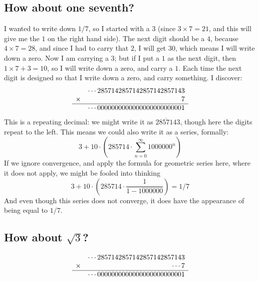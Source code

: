 \documentclass[12pt]{article}
\begin{document}
\subsection*{How about one seventh?}

I wanted to write down $1/7$, so I started with a $3$ (since $3 \times
7 = 21$, and this will give me the $1$ on the right hand side).  The
next digit should be a $4$, because $4 \times 7 = 28$, and since I had
to carry that $2$, I will get $30$, which means I will write down a
zero.  Now I am carrying a $3$; but if I put a $1$ as the next digit,
then $1 \times 7 + 3 = 10$, so I will write down a zero, and carry a
$1$.  Each time the next digit is designed so that I write down a
zero, and carry something.  I discover:
$$
\begin{array}{cr}
       & \cdots 2857142857142857142857143 \\
\times &  7 \\
\hline
 & \cdots 0000000000000000000000001 \\
\end{array}
$$ This is a repeating decimal: we might write it as
$\overline{285714}3$, though here the digits repeat to the left.
This means we could also write it as a series, formally:
$$
3 + 10 \cdot \left( 285714 \cdot \sum_{n=0}^\infty 1000000^n \right)
$$
If we ignore convergence, and apply the formula for geometric
series here, where it does not apply, we might be fooled into thinking
$$
3 + 10 \cdot \left( 285714 \cdot \frac{1}{1 - 1000000} \right) = 1/7
$$ And even though this series does not converge, it does have the
appearance of being equal to $1/7$.

\subsection*{How about $\sqrt{3}$?}


$$
\begin{array}{cr}
       & \cdots 2857142857142857142857143 \\
\times & \cdots 7 \\
\hline
 & \cdots 0000000000000000000000001 \\
\end{array}
$$
\end{document}
